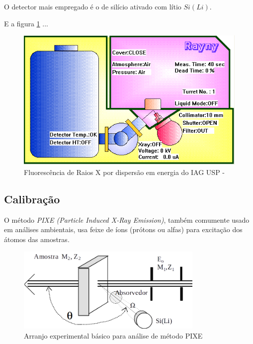 O detector mais empregado é o de silício ativado com lítio $Si(Li)$.



E a figura \ref{fig:xrfed_iag} ...

\begin{figure}[H]
\begin{center}
  \includegraphics[scale=0.4]{../inputs/images/edx_iag_monitor.png}
  \caption{Fluorescência de Raios X por dispersão em energia do IAG USP - \label{fig:xrfed_iag}}
\end{center}
\end{figure}

\subsection{Calibração}

O método \textit{PIXE (Particle Induced X-Ray Emission)}, 
também comumente usado em análises ambientais, usa feixe de íons 
(prótons ou alfas) para excitação dos átomos das amostras.

\begin{figure}[H]
\begin{center} 
  \includegraphics[width=0.8\textwidth]{../inputs/images/arranjopixe.png}
  \caption{Arranjo experimental básico para análise de método PIXE 
           \cite{tabacniks2000} \label{fig:arranjopixe}}
\end{center}
\end{figure}

